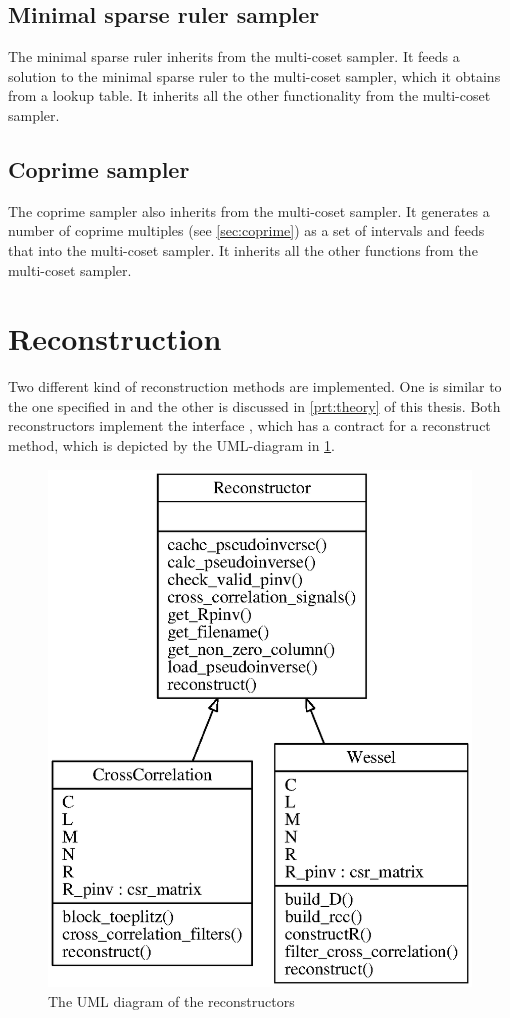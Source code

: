 \documentclass[a4paper, openany, oneside]{memoir}
\begin{document}
\subsection{Minimal sparse ruler sampler}
\label{sec:multi-coset-sampler}
The minimal sparse ruler inherits from the multi-coset sampler. It feeds a solution to the minimal sparse ruler to the multi-coset sampler, which it obtains from a lookup table. It inherits all the other functionality from the multi-coset sampler.

\subsection{Coprime sampler}
\label{sec:coprime-sampler}
The coprime sampler also inherits from the multi-coset sampler. It generates a number of coprime multiples (see \cref{sec:coprime}) as a set of intervals and feeds that into the multi-coset sampler. It inherits all the other functions from the multi-coset sampler.

\section{Reconstruction}
\label{sec:reconstruction}
Two different kind of reconstruction methods are implemented. One is similar to the one specified in \cite{ariananda2012compressive} and the other is discussed in \cref{prt:theory} of this thesis. Both reconstructors implement the interface , which has a contract for a reconstruct method, which is depicted by the UML-diagram in \cref{fig:umlreconstructor}.

\begin{figure}[h]
    \centering
    \includegraphics[width=0.5\linewidth]{./figures/classes_reconstruction.eps}
    \caption{The UML diagram of the reconstructors}
    \label{fig:umlreconstructor}
\end{figure}
\end{document}
